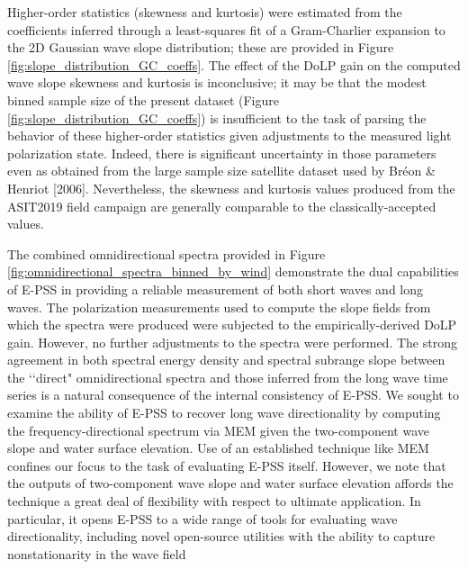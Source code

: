 \documentclass[letterpaper,journal]{IEEEtran}
\begin{document}
Higher-order statistics (skewness and kurtosis) were estimated from the coefficients inferred through a least-squares fit of a Gram-Charlier expansion to the 2D Gaussian wave slope distribution; these are provided in Figure \ref{fig:slope_distribution_GC_coeffs}. The effect of the DoLP gain on the computed wave slope skewness and kurtosis is inconclusive; it may be that the modest binned sample size of the present dataset (Figure \ref{fig:slope_distribution_GC_coeffs}) is insufficient to the task of parsing the behavior of these higher-order statistics given adjustments to the measured light polarization state. Indeed, there is significant uncertainty in those parameters even as obtained from the large sample size satellite dataset used by Br\'eon \& Henriot [2006]. Nevertheless, the skewness and kurtosis values produced from the ASIT2019 field campaign are generally comparable to the classically-accepted values.

The combined omnidirectional spectra provided in Figure \ref{fig:omnidirectional_spectra_binned_by_wind} demonstrate the dual capabilities of E-PSS in providing a reliable measurement of both short waves and long waves. The polarization measurements used to compute the slope fields from which the spectra were produced were subjected to the empirically-derived DoLP gain. However, no further adjustments to the spectra were performed. The strong agreement in both spectral energy density and spectral subrange slope between the \lq\lq direct" omnidirectional spectra and those inferred from the long wave time series is a natural consequence of the internal consistency of E-PSS. We sought to examine the ability of E-PSS to recover long wave directionality by computing the frequency-directional spectrum via MEM \cite{lygre_maximum_1986} given the two-component wave slope and water surface elevation. Use of an established technique like MEM confines our focus to the task of evaluating E-PSS itself. However, we note that the outputs of two-component wave slope and water surface elevation affords the technique a great deal of flexibility with respect to ultimate application. In particular, it opens E-PSS to a wide range of tools for evaluating wave directionality, including novel open-source utilities with the ability to capture nonstationarity in the wave field \cite{pelaez-zapata_ocean_2024,pelaez-zapata_ewdm_2025}
\end{document}
